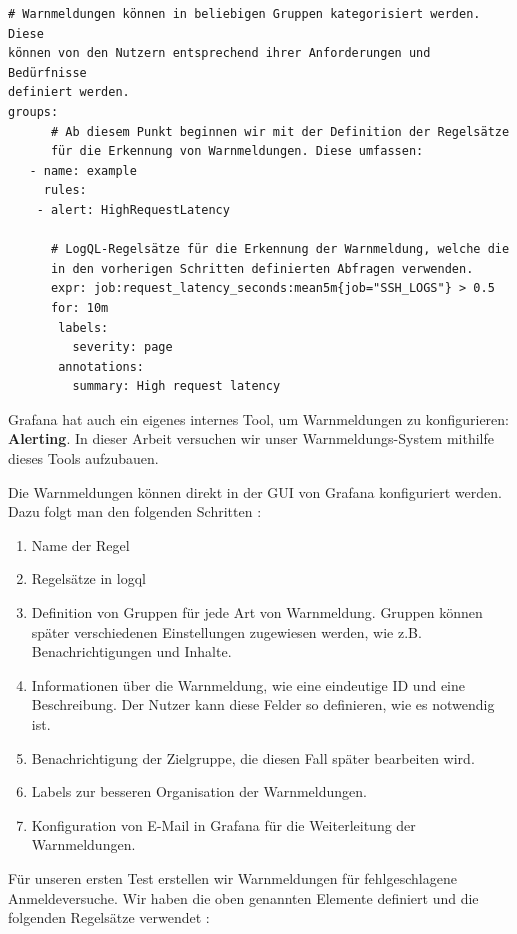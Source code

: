 {
\begin{Verbatim}[frame=single]
# Warnmeldungen können in beliebigen Gruppen kategorisiert werden. Diese
können von den Nutzern entsprechend ihrer Anforderungen und Bedürfnisse 
definiert werden.
groups:
      # Ab diesem Punkt beginnen wir mit der Definition der Regelsätze 
      für die Erkennung von Warnmeldungen. Diese umfassen:
   - name: example
     rules:
    - alert: HighRequestLatency

      # LogQL-Regelsätze für die Erkennung der Warnmeldung, welche die 
      in den vorherigen Schritten definierten Abfragen verwenden.
      expr: job:request_latency_seconds:mean5m{job="SSH_LOGS"} > 0.5
      for: 10m
       labels:
         severity: page
       annotations:
         summary: High request latency
\end{Verbatim}
}


Grafana hat auch ein eigenes internes Tool, um Warnmeldungen zu konfigurieren: \textbf{Alerting}. In dieser Arbeit versuchen wir unser Warnmeldungs-System mithilfe dieses Tools aufzubauen.

Die Warnmeldungen können direkt in der \gls{GUI} von Grafana konfiguriert werden. Dazu folgt man den folgenden Schritten \citep{Grafana_alerting}:

{
\begin{enumerate}[noitemsep]
   \item Name der Regel
   \item Regelsätze in \gls{logql}
   \item Definition von Gruppen für jede Art von Warnmeldung. Gruppen können später verschiedenen Einstellungen zugewiesen werden, wie z.B. Benachrichtigungen und Inhalte.
   \item Informationen über die Warnmeldung, wie eine eindeutige ID und eine Beschreibung. Der Nutzer kann diese Felder so definieren, wie es notwendig ist.
   \item Benachrichtigung der Zielgruppe, die diesen Fall später bearbeiten wird.
   \item Labels zur besseren Organisation der Warnmeldungen.
   \item Konfiguration von E-Mail in Grafana für die Weiterleitung der Warnmeldungen.
\end{enumerate}
}

Für unseren ersten Test erstellen wir Warnmeldungen für fehlgeschlagene Anmeldeversuche. Wir haben die oben genannten Elemente definiert und die folgenden Regelsätze verwendet \citep{VoidQuark_sshlogs}:

